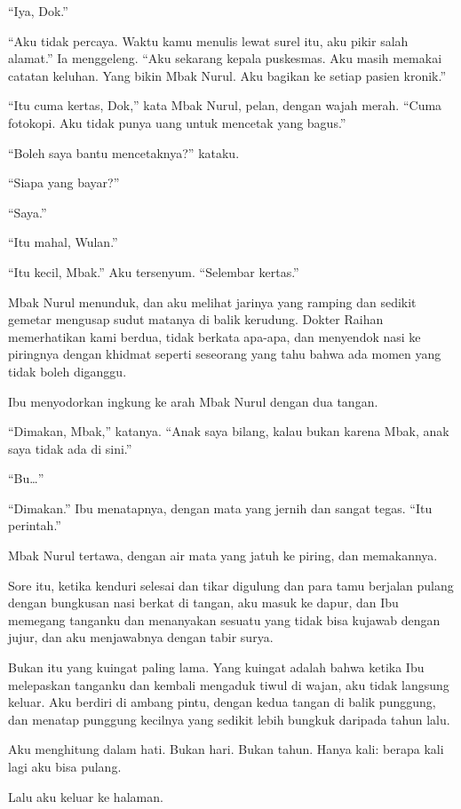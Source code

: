 \documentclass[11pt,twoside,openany]{book}
\makeatletter
\newcommand{\scenebreak}{\par\vspace{0.9em}{\centering\textsc{*\hspace{0.7em}*\hspace{0.7em}*}\par}\vspace{0.9em}\@afterindentfalse\@afterheading}
\makeatother
\begin{document}
``Iya, Dok.''

``Aku tidak percaya. Waktu kamu menulis lewat surel itu, aku pikir salah alamat.'' Ia menggeleng. ``Aku sekarang kepala puskesmas. Aku masih memakai catatan keluhan. Yang bikin Mbak Nurul. Aku bagikan ke setiap pasien kronik.''

``Itu cuma kertas, Dok,'' kata Mbak Nurul, pelan, dengan wajah merah. ``Cuma fotokopi. Aku tidak punya uang untuk mencetak yang bagus.''

``Boleh saya bantu mencetaknya?'' kataku.

``Siapa yang bayar?''

``Saya.''

``Itu mahal, Wulan.''

``Itu kecil, Mbak.'' Aku tersenyum. ``Selembar kertas.''

Mbak Nurul menunduk, dan aku melihat jarinya yang ramping dan sedikit gemetar mengusap sudut matanya di balik kerudung. Dokter Raihan memerhatikan kami berdua, tidak berkata apa-apa, dan menyendok nasi ke piringnya dengan khidmat seperti seseorang yang tahu bahwa ada momen yang tidak boleh diganggu.

Ibu menyodorkan ingkung ke arah Mbak Nurul dengan dua tangan.

``Dimakan, Mbak,'' katanya. ``Anak saya bilang, kalau bukan karena Mbak, anak saya tidak ada di sini.''

``Bu\ldots{}''

``Dimakan.'' Ibu menatapnya, dengan mata yang jernih dan sangat tegas. ``Itu perintah.''

Mbak Nurul tertawa, dengan air mata yang jatuh ke piring, dan memakannya.

\scenebreak
Sore itu, ketika kenduri selesai dan tikar digulung dan para tamu berjalan pulang dengan bungkusan nasi berkat di tangan, aku masuk ke dapur, dan Ibu memegang tanganku dan menanyakan sesuatu yang tidak bisa kujawab dengan jujur, dan aku menjawabnya dengan tabir surya.

Bukan itu yang kuingat paling lama. Yang kuingat adalah bahwa ketika Ibu melepaskan tanganku dan kembali mengaduk tiwul di wajan, aku tidak langsung keluar. Aku berdiri di ambang pintu, dengan kedua tangan di balik punggung, dan menatap punggung kecilnya yang sedikit lebih bungkuk daripada tahun lalu.

Aku menghitung dalam hati. Bukan hari. Bukan tahun. Hanya kali: berapa kali lagi aku bisa pulang.

Lalu aku keluar ke halaman.
\end{document}
